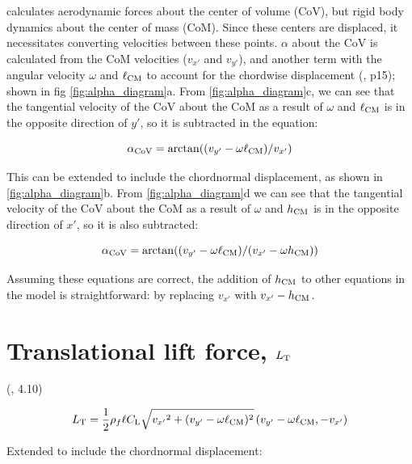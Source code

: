 \documentclass[draft]{jfm} %
\begin{document}
\cite{Li2022model} calculates aerodynamic forces about the center of volume (CoV), but rigid body dynamics about the center of mass (CoM). Since these centers are displaced, it necessitates converting velocities between these points. $\alpha$ about the CoV is calculated from the CoM velocities ($v_{x'}$ and $v_{y'}$), and another term with the angular velocity $\omega$ and $\ell_{\textup{CM}}$ to account for the chordwise displacement (\cite{Li2022model}, p15); shown in fig \ref{fig:alpha_diagram}a. From \ref{fig:alpha_diagram}c, we can see that the tangential velocity of the CoV about the CoM as a result of $\omega$ and $\ell_{\textup{CM}}$ is in the opposite direction of $y'$, so it is subtracted in the equation:

\begin{equation} \alpha_{\textnormal{CoV}} = \arctan((v_{y'} - \omega\ell_{\textup{CM}})/v_{x'}) \label{eq:alpha1} \end{equation}

This can be extended to include the chordnormal displacement, as shown in  \ref{fig:alpha_diagram}b. From \ref{fig:alpha_diagram}d we can see that the tangential velocity of the CoV about the CoM as a result of $\omega$ and $h_{\textup{CM}}$ is in the opposite direction of $x'$, so it is also subtracted:

\begin{equation} \alpha_{\textnormal{CoV}}  = \arctan((v_{y'} - \omega\ell_{\textup{CM}})/(v_{x'}- \omega h_{\textup{CM}})) \label{eq:alpha2} \end{equation} 

Assuming these equations are correct, the addition of $h_{\textup{CM}}$ to other equations in the model is straightforward: by replacing $v_{x'}$ with $v_{x'}-h_{\textup{CM}}$.

\section{Translational lift force, $L_{\textnormal{T}}$} \label{sec:lt}

(\cite{Li2022model}, 4.10)

\begin{equation}
 L_{\textnormal{T}} = \frac{1}{2}\rho_f\ell C_{\textnormal{L}}\sqrt{{v_{x'}}^2+(v_{y'}- \omega \ell_{\textup{CM}})^2}\left ( v_{y'}- \omega\ell_{\textup{CM}}, {-v_{x'}} \right ) 
\end{equation}

Extended to include the chordnormal displacement:
\end{document}
